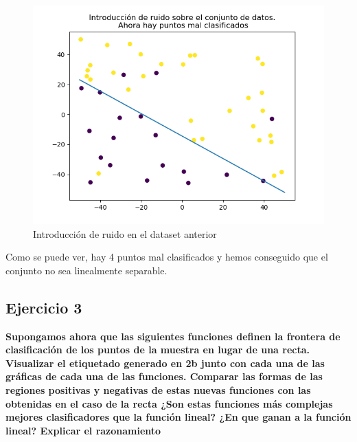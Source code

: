 \begin{itemize}
	\begin{figure}[H] %
		\centering
		\includegraphics[scale=0.5]{recta2.png}  %
		\caption{Introducción de ruido en el dataset anterior} 
		\label{fig:recta2}
	\end{figure}

Como se puede ver, hay 4 puntos mal clasificados y hemos conseguido que el conjunto no sea linealmente separable.
\end{itemize}

\subsection{Ejercicio 3}

\textbf{Supongamos ahora que las siguientes funciones definen la frontera de clasificación de los puntos de la muestra en lugar de una recta. Visualizar el etiquetado generado en 2b junto con cada una de las gráficas de cada una de las funciones. Comparar las formas de las regiones positivas y negativas de estas nuevas 	funciones con las obtenidas en el caso de la recta ¿Son estas funciones más complejas	mejores clasificadores que la función lineal? ¿En que ganan a la función lineal? Explicar el razonamiento}



